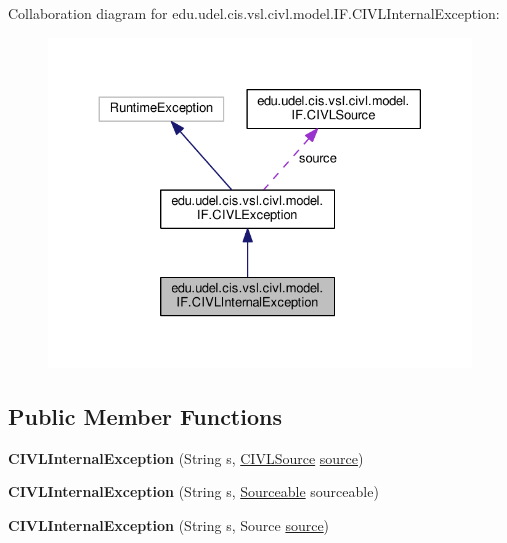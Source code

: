Collaboration diagram for edu.\+udel.\+cis.\+vsl.\+civl.\+model.\+I\+F.\+C\+I\+V\+L\+Internal\+Exception\+:
\nopagebreak
\begin{figure}[H]
\begin{center}
\leavevmode
\includegraphics[width=330pt]{classedu_1_1udel_1_1cis_1_1vsl_1_1civl_1_1model_1_1IF_1_1CIVLInternalException__coll__graph}
\end{center}
\end{figure}
\subsection*{Public Member Functions}
\begin{DoxyCompactItemize}
\item 
\hypertarget{classedu_1_1udel_1_1cis_1_1vsl_1_1civl_1_1model_1_1IF_1_1CIVLInternalException_a126e3b7d9f1be8fdc771829a88dd8888}{}{\bfseries C\+I\+V\+L\+Internal\+Exception} (String s, \hyperlink{interfaceedu_1_1udel_1_1cis_1_1vsl_1_1civl_1_1model_1_1IF_1_1CIVLSource}{C\+I\+V\+L\+Source} \hyperlink{classedu_1_1udel_1_1cis_1_1vsl_1_1civl_1_1model_1_1IF_1_1CIVLException_a29eba9d3541bcd7e2306404c6ece4d98}{source})\label{classedu_1_1udel_1_1cis_1_1vsl_1_1civl_1_1model_1_1IF_1_1CIVLInternalException_a126e3b7d9f1be8fdc771829a88dd8888}

\item 
\hypertarget{classedu_1_1udel_1_1cis_1_1vsl_1_1civl_1_1model_1_1IF_1_1CIVLInternalException_a40b4b207259f13c3b65926e79fb50971}{}{\bfseries C\+I\+V\+L\+Internal\+Exception} (String s, \hyperlink{interfaceedu_1_1udel_1_1cis_1_1vsl_1_1civl_1_1model_1_1IF_1_1Sourceable}{Sourceable} sourceable)\label{classedu_1_1udel_1_1cis_1_1vsl_1_1civl_1_1model_1_1IF_1_1CIVLInternalException_a40b4b207259f13c3b65926e79fb50971}

\item 
\hypertarget{classedu_1_1udel_1_1cis_1_1vsl_1_1civl_1_1model_1_1IF_1_1CIVLInternalException_a0221b4ff13a4441e61816cf33bec5950}{}{\bfseries C\+I\+V\+L\+Internal\+Exception} (String s, Source \hyperlink{classedu_1_1udel_1_1cis_1_1vsl_1_1civl_1_1model_1_1IF_1_1CIVLException_a29eba9d3541bcd7e2306404c6ece4d98}{source})\label{classedu_1_1udel_1_1cis_1_1vsl_1_1civl_1_1model_1_1IF_1_1CIVLInternalException_a0221b4ff13a4441e61816cf33bec5950}

\end{DoxyCompactItemize}
